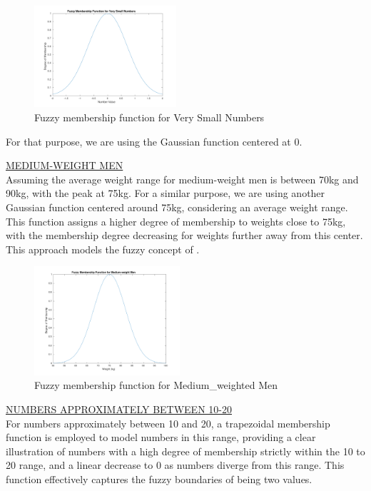 \begin{figure}[H]
	\centering
	\includegraphics[width=0.47\textwidth]{../Problem 7/small_int.pdf}
	\caption{Fuzzy membership function for Very Small Numbers}	
\end{figure}
For that purpose, we are using the Gaussian function centered at 0.
\vspace{5mm}

\underline{MEDIUM-WEIGHT MEN}\\
Assuming the average weight range for medium-weight men is between 70kg and 90kg, with the peak at 75kg. For a similar purpose, we are using another Gaussian function centered around 75kg, considering an average weight range. This function assigns a higher degree of membership to weights close to 75kg, with the membership degree decreasing for weights further away from this center. This approach models the fuzzy concept of .

\begin{figure}[H]
	\centering
	\includegraphics[width=0.48\textwidth]{../Problem 7/medium_weight.pdf}
	\caption{Fuzzy membership function for Medium\_weighted Men}	
\end{figure}
\vspace{5mm}

\underline{NUMBERS APPROXIMATELY BETWEEN 10-20}\\
For numbers approximately between 10 and 20, a trapezoidal membership function is employed to model numbers in this range, providing a clear illustration of numbers with a high degree of membership strictly within the 10 to 20 range, and a linear decrease to 0 as numbers diverge from this range. This function effectively captures the fuzzy boundaries of being  two values.

